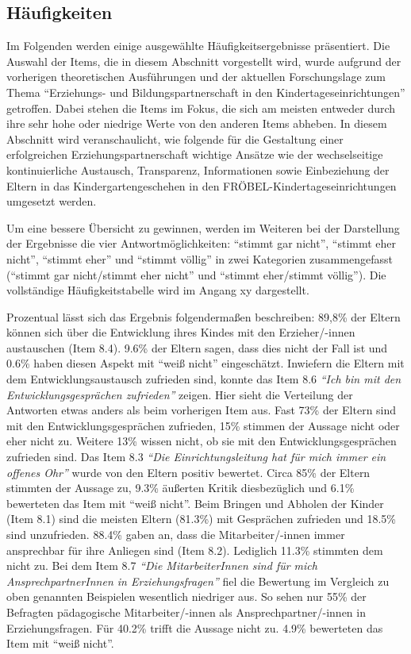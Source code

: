 \documentclass[12pt,a4paper]{article}
\begin{document}
\subsection{Häufigkeiten} 

Im Folgenden werden einige ausgewählte Häufigkeitsergebnisse präsentiert. Die Auswahl der Items, die in diesem Abschnitt vorgestellt wird, wurde aufgrund der vorherigen theoretischen Ausführungen und der aktuellen Forschungslage zum Thema "`Erziehungs- und Bildungspartnerschaft in den Kindertageseinrichtungen"' getroffen. Dabei stehen die Items im Fokus, die sich am meisten entweder durch ihre sehr hohe oder niedrige Werte von den anderen Items abheben. In diesem Abschnitt wird veranschaulicht, wie folgende für die Gestaltung einer erfolgreichen Erziehungspartnerschaft wichtige Ansätze wie der wechselseitige kontinuierliche Austausch, Transparenz, Informationen sowie Einbeziehung der Eltern in das Kindergartengeschehen in den FRÖBEL-Kindertageseinrichtungen umgesetzt werden.

	Um eine bessere Übersicht zu gewinnen, werden im Weiteren bei der Darstellung der Ergebnisse die vier Antwortmöglichkeiten: "`stimmt gar nicht"', "`stimmt eher nicht"', "`stimmt eher"' und "`stimmt völlig"' in zwei Kategorien zusammengefasst ("`stimmt gar nicht/stimmt eher nicht"' und "`stimmt eher/stimmt völlig"'). Die vollständige Häufigkeitstabelle wird im Angang xy dargestellt.
	
	Prozentual lässt sich das Ergebnis folgendermaßen beschreiben: 89,8\% der Eltern können sich über die Entwicklung ihres Kindes mit den Erzieher/-innen austauschen (Item 8.4). 9.6\% der Eltern sagen, dass dies nicht der Fall ist und  0.6\% haben diesen Aspekt mit "`weiß nicht"' eingeschätzt.  Inwiefern die Eltern mit dem Entwicklungsaustausch zufrieden sind, konnte das Item 8.6 \textit{"`Ich bin mit den Entwicklungsgesprächen zufrieden"'} zeigen. Hier sieht die Verteilung der Antworten etwas anders als beim vorherigen Item aus. Fast 73\% der Eltern sind mit den Entwicklungsgesprächen zufrieden, 15\% stimmen der Aussage nicht oder eher nicht zu. Weitere 13\% wissen nicht, ob sie mit den Entwicklungsgesprächen zufrieden sind. Das Item 8.3 \textit{"`Die Einrichtungsleitung hat für mich immer ein offenes Ohr"'} wurde von den Eltern positiv bewertet. Circa 85\% der Eltern stimmten der Aussage zu, 9.3\% äußerten Kritik diesbezüglich und 6.1\% bewerteten das Item mit "`weiß nicht"'. Beim Bringen und Abholen der Kinder (Item 8.1) sind die meisten Eltern (81.3\%) mit Gesprächen zufrieden und 18.5\% sind unzufrieden. 88.4\% gaben an, dass die Mitarbeiter/-innen immer ansprechbar für ihre Anliegen sind (Item 8.2). Lediglich 11.3\% stimmten dem nicht zu. Bei dem Item 8.7 \textit{"`Die MitarbeiterInnen sind für mich AnsprechpartnerInnen in Erziehungsfragen"'} fiel die Bewertung im Vergleich zu oben genannten Beispielen wesentlich niedriger aus. So sehen nur 55\% der Befragten pädagogische Mitarbeiter/-innen als Ansprechpartner/-innen in Erziehungsfragen. Für 40.2\% trifft die Aussage nicht zu. 4.9\% bewerteten das Item mit "`weiß nicht"'.
	
\end{document}
